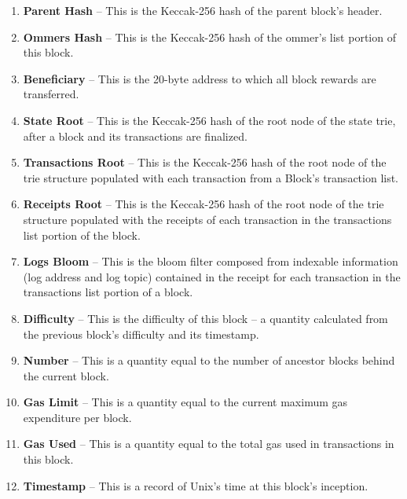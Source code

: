 \documentclass[10pt,a4paper,oneside]{scrartcl}
\begin{document}
                                \begin{enumerate}
                                        \item \textbf{Parent Hash} -- This is the Keccak-256 hash of the parent block's header.
                                        \item \textbf{Ommers Hash} -- This is the Keccak-256 hash of the ommer's list portion of this block.
                                        \item \textbf{Beneficiary} -- This is the 20-byte address to which all block rewards are transferred.
                                        \item \textbf{State Root} -- This is the Keccak-256 hash of the root node of the state trie, after a block and its transactions are finalized.
                                        \item \textbf{Transactions Root} -- This is the Keccak-256 hash of the root node of the trie structure populated with each transaction from a Block's transaction list.
                                        \item \textbf{Receipts Root} -- This is the Keccak-256 hash of the root node of the trie structure populated with the receipts of each transaction in the transactions list portion of the block.
                                        \item \textbf{Logs Bloom} -- This is the bloom filter composed from indexable information (log address and log topic) contained in the receipt for each transaction in the transactions list portion of a block.
                                        \item \textbf{Difficulty} -- This is the difficulty of this block -- a quantity calculated from the previous block's difficulty and its timestamp.
                                        \item \textbf{Number} -- This is a quantity equal to the number of ancestor blocks behind the current block.
                                        \item \textbf{Gas Limit} -- This is a quantity equal to the current maximum gas expenditure per block.
                                        \item \textbf{Gas Used} -- This is a quantity equal to the total gas used in transactions in this block.
                                        \item \textbf{Timestamp} -- This is a record of Unix's time at this block's inception.

\end{enumerate}
\end{document}
